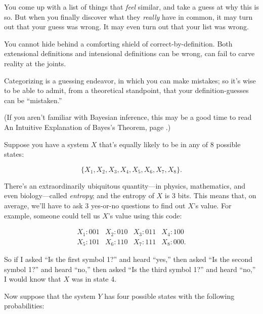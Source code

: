 { You come up with a list of things that \textit{feel} similar, and
take a guess at why this is so. But when you finally discover what they
\textit{really} have in common, it may turn out that your guess was
wrong. It may even turn out that your list was wrong.


 You cannot hide behind a comforting shield of
correct-by-definition. Both extensional definitions and intensional
definitions can be wrong, can fail to carve reality at the joints.


 Categorizing is a guessing endeavor, in which you can make
mistakes; so it's wise to be able to admit, from a
theoretical standpoint, that your definition-guesses can be
``mistaken.''

\myendsectiontext



 (If you aren't familiar with Bayesian inference,
this may be a good time to read An Intuitive Explanation of
Bayes's Theorem, page \pageref{intuitive_bayesian}.) 


 Suppose you have a system $X$ that's equally likely
to be in any of 8 possible states:

\begin{equation*}
\{X_{1},X_{2}, X_{3}, X_{4}, X_{5}, X_{6}, X_{7}, X_{8} \}.
\end{equation*}


 There's an extraordinarily ubiquitous
quantity---in physics, mathematics, and even biology---called
\textit{entropy}; and the entropy of $X$ is 3 bits. This means that, on
average, we'll have to ask 3 yes-or-no questions to
find out $X$'s value. For example, someone could tell us
$X$'s value using this code:

\begin{equation*}
  \begin{array}{llll}
 X_{1} : 001 &  X_{2} : 010 &  X_{3} : 011 &  X_{4} : 100 \\
 X_{5} : 101 &  X_{6} : 110 &  X_{7} : 111 &  X_{8} : 000.
 \end{array}
\end{equation*}


\bigskip


 So if I asked ``Is the first symbol
1?'' and heard
``yes,'' then asked
``Is the second symbol 1?'' and
heard ``no,'' then asked
``Is the third symbol 1?'' and heard
``no,'' I would know that $X$ was in
state 4.


 Now suppose that the system $Y$ has four possible states with the
following probabilities:

}
